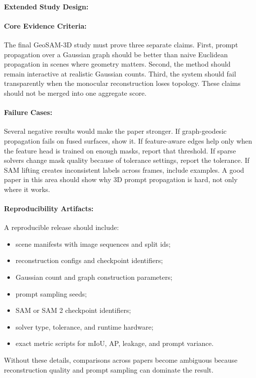 \documentclass{article}
\begin{document}
\paragraph{Extended Study Design:}

\paragraph{Core Evidence Criteria:}

The final GeoSAM-3D study must prove three separate claims. First, prompt propagation over a Gaussian graph should be better than naive Euclidean propagation in scenes where geometry matters. Second, the method should remain interactive at realistic Gaussian counts. Third, the system should fail transparently when the monocular reconstruction loses topology. These claims should not be merged into one aggregate score.

\paragraph{Failure Cases:}

Several negative results would make the paper stronger. If graph-geodesic propagation fails on fused surfaces, show it. If feature-aware edges help only when the feature head is trained on enough masks, report that threshold. If sparse solvers change mask quality because of tolerance settings, report the tolerance. If SAM lifting creates inconsistent labels across frames, include examples. A good paper in this area should show why 3D prompt propagation is hard, not only where it works.

\paragraph{Reproducibility Artifacts:}

A reproducible release should include:
\begin{itemize}
  \item scene manifests with image sequences and split ids;
  \item reconstruction configs and checkpoint identifiers;
  \item Gaussian count and graph construction parameters;
  \item prompt sampling seeds;
  \item SAM or SAM 2 checkpoint identifiers;
  \item solver type, tolerance, and runtime hardware;
  \item exact metric scripts for mIoU, AP, leakage, and prompt variance.
\end{itemize}
Without these details, comparisons across papers become ambiguous because reconstruction quality and prompt sampling can dominate the result.
\end{document}
